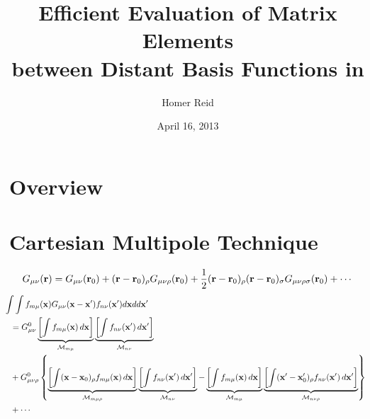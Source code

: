 \documentclass[letterpaper]{article}
\title {Efficient Evaluation of Matrix Elements \\
        between Distant Basis Functions in \ls}
\author {Homer Reid}
\date {April 16, 2013}
\begin{document}
\pagestyle{myheadings}
\maketitle

\tableofcontents

\newpage
\section{Overview}

\newpage
\section{Cartesian Multipole Technique}

$$ G_{\mu\nu}(\mathbf{r}) = 
     G_{\mu\nu}(\mathbf{r}_0) 
   + (\mathbf{r} - \mathbf{r}_0)_\rho G_{\mu\nu\rho}(\mathbf{r}_0) 
   + \frac{1}{2}(\mathbf{r} - \mathbf{r}_0)_\rho (\mathbf{r} - \mathbf{r}_0)_\sigma 
     G_{\mu\nu\rho\sigma}(\mathbf{r}_0) + \cdots
$$
\begin{align*}
&\hspace{-0.1in} 
\int \int f_{m\mu}(\vb x) G_{\mu\nu}(\vb x-\vb x^\prime) f_{n\nu}(\vb x^\prime)
  d\vb x d d\vb x^\prime
\\
&=
 G_{\mu\nu}^0
 \underbrace{\left[ \int f_{m\mu}(\vb x) \, d\vb x \right]}
           _{\mc M_{m\mu}}
 \underbrace{\left[ \int f_{n\nu}(\vb x^\prime) \, d\vb x^\prime \right]}
           _{\mc M_{n\nu}}
\\
&+
 G_{\mu\nu\rho}^0
 \left\{ \underbrace{
            \left[ \int (\vb x - \vb x_0)_\rho f_{m\mu}(\vb x) \, d\vb x \right]
                    }_{\mc M_{m\mu\rho}}
         \underbrace{
         \left[ \int f_{n\nu}(\vb x^\prime) \, d\vb x^\prime \right]
                    }_{\mc M_{n\nu}}
        -
         \underbrace{
         \left[ \int f_{m\mu}(\vb x) \, d\vb x \right]
                    }_{\mc M_{m\mu}}
         \underbrace{
         \left[ \int (\vb x^\prime-\vb x^\prime_0)_\rho 
                     f_{n\nu}(\vb x^\prime) \, d\vb x^\prime \right]
                    }_{\mc M_{n\nu\rho}}
 \right\}     
\\
&+\cdots
\end{align*}
\end{document}
